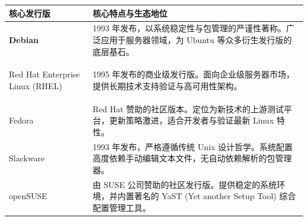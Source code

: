 \documentclass[border=15pt]{standalone} %
\begin{document}
\sffamily
\renewcommand{\arraystretch}{1.5}

\begin{tabularx}{16cm}{>{\bfseries}p{4.5cm} X}
	\rowcolor{headerbg}
	\toprule
	\textcolor{headertext}{\textbf{核心发行版}} & \textcolor{headertext}{\textbf{核心特点与生态地位}}                                 \\
	\midrule

	Debian                                 & 1993 年发布，以系统稳定性与包管理的严谨性著称。广泛应用于服务器领域，为 Ubuntu 等众多衍生发行版的底层基石。               \\
	\addlinespace[1ex]

	Red Hat Enterprise Linux (RHEL)        & 1995 年发布的商业级发行版。面向企业级服务器市场，提供长期技术支持验证与高可用性架构。                              \\
	\addlinespace[1ex]

	Fedora                                 & Red Hat 赞助的社区版本。定位为新技术的上游测试平台，更新策略激进，适合开发者与验证最新 Linux 特性。                  \\
	\addlinespace[1ex]

	Slackware                              & 1993 年发布，严格遵循传统 Unix 设计哲学。系统配置高度依赖手动编辑文本文件，无自动依赖解析的包管理器。                   \\
	\addlinespace[1ex]

	openSUSE                               & 由 SUSE 公司赞助的社区发行版。提供稳定的系统环境，并内置著名的 YaST (Yet another Setup Tool) 综合配置管理工具。 \\

	\bottomrule
\end{tabularx}
\end{document}
